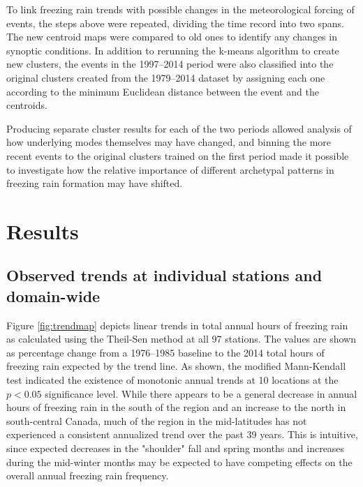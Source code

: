 \documentclass[twocol]{ametsoc}
\begin{document}
To link freezing rain trends with possible changes in the meteorological forcing of events, the steps above were repeated, dividing the time record into two spans. The new centroid maps were compared to old ones to identify any changes in synoptic conditions. In addition to rerunning the k-means algorithm to create new clusters, the events in the 1997--2014 period were also classified into the original clusters created from the 1979--2014 dataset by assigning each one according to the minimum Euclidean distance between the event and the centroids. 

Producing separate cluster results for each of the two periods allowed analysis of how underlying modes themselves may have changed, and binning the more recent events to the original clusters trained on the first period made it possible to investigate how the relative importance of different archetypal patterns in freezing rain formation may have shifted.

\section{Results}

\subsection{Observed trends at individual stations and domain-wide}


Figure \ref{fig:trendmap} depicts linear trends in total annual hours of freezing rain as calculated using the Theil-Sen method at all 97 stations. The values are shown as percentage change from a 1976--1985 baseline to the 2014 total hours of freezing rain expected by the trend line. As shown, the modified Mann-Kendall test indicated the existence of monotonic annual trends at 10 locations at the $p<0.05$ significance level. While there appears to be a general decrease in annual hours of freezing rain in the south of the region and an increase to the north in south-central Canada, much of the region in the mid-latitudes has not experienced a consistent annualized trend over the past 39 years. This is intuitive, since expected decreases in the "shoulder" fall and spring months and increases during the mid-winter months may be expected to have competing effects on the overall annual freezing rain frequency.
\end{document}
